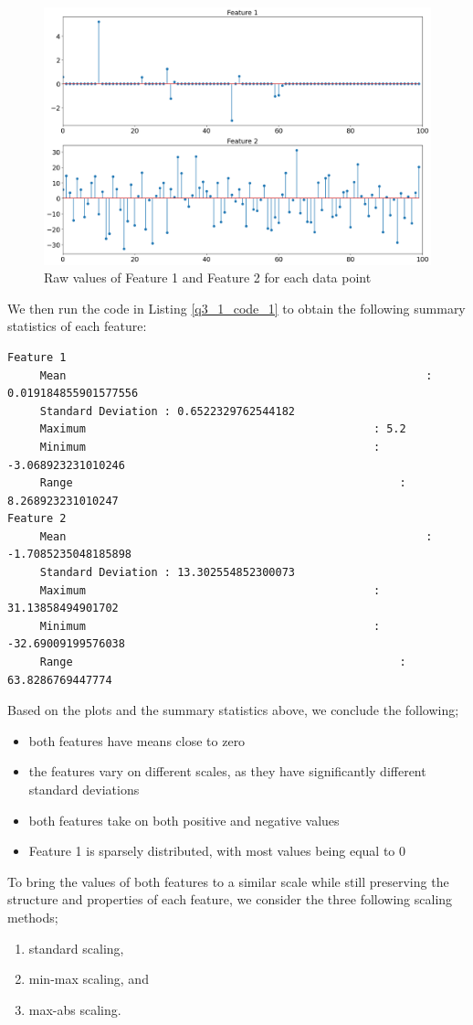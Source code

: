 \documentclass{article}[a4paper]
\begin{document}
	\begin{figure}[H]
		\centering
		\includegraphics[width=\linewidth]{images/q3_1_1.png}
		\caption{Raw values of Feature 1 and Feature 2 for each data point}
		\label{q3_1_1_img}
	\end{figure}

	We then run the code in Listing \ref{q3_1_code_1} to obtain the following summary statistics of each feature:
	\begin{verbatim}
Feature 1
	 Mean 														: 0.019184855901577556
	 Standard Deviation : 0.6522329762544182
	 Maximum 											: 5.2
	 Minimum 											: -3.068923231010246
	 Range 													: 8.268923231010247
Feature 2
	 Mean 														: -1.7085235048185898
	 Standard Deviation : 13.302554852300073
	 Maximum 											: 31.13858494901702
	 Minimum 											: -32.69009199576038
	 Range 													: 63.8286769447774
	\end{verbatim}

	Based on the plots and the summary statistics above, we conclude the following;
	\begin{itemize}[itemsep=1pt]
		\item both features have means close to zero
		\item the features vary on different scales, as they have significantly different standard deviations
		\item both features take on both positive and negative values
		\item Feature 1 is sparsely distributed, with most values being equal to 0
	\end{itemize}

	To bring the values of both features to a similar scale while still preserving the structure and properties of
	each feature, we consider the three following scaling methods;
	\begin{enumerate}[itemsep=1pt]
		\item standard scaling,
		\item min-max scaling, and
		\item max-abs scaling.
	\end{enumerate}
	
\end{document}
